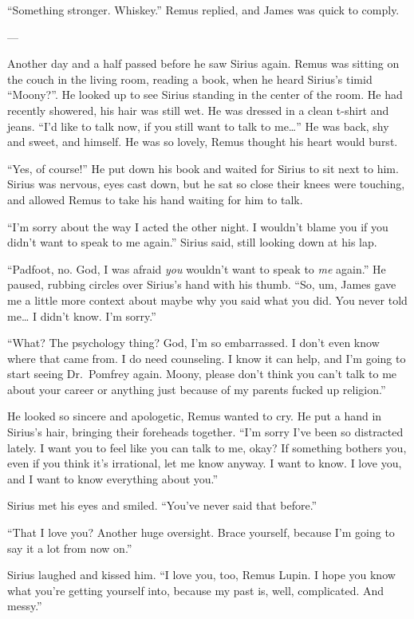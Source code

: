 \documentclass[12pt,twoside,openright]{memoir}
\begin{document}
``Something stronger. Whiskey.'' Remus replied, and James was quick to comply.

---

Another day and a half passed before he saw Sirius again. Remus was sitting on the couch in the living room, reading a book, when he heard Sirius's timid ``Moony?''. He looked up to see Sirius standing in the center of the room. He had recently showered, his hair was still wet. He was dressed in a clean t-shirt and jeans. ``I'd like to talk now, if you still want to talk to me…'' He was back, shy and sweet, and himself. He was so lovely, Remus thought his heart would burst.

``Yes, of course!'' He put down his book and waited for Sirius to sit next to him. Sirius was nervous, eyes cast down, but he sat so close their knees were touching, and allowed Remus to take his hand waiting for him to talk.

``I'm sorry about the way I acted the other night. I wouldn't blame you if you didn't want to speak to me again.'' Sirius said, still looking down at his lap.

``Padfoot, no. God, I was afraid \textit{you} wouldn't want to speak to \textit{me} again.'' He paused, rubbing circles over Sirius's hand with his thumb. ``So, um, James gave me a little more context about maybe why you said what you did. You never told me… I didn't know. I'm sorry.''

``What? The psychology thing? God, I'm so embarrassed. I don't even know where that came from. I do need counseling. I know it can help, and I'm going to start seeing Dr.\ Pomfrey again. Moony, please don't think you can't talk to me about your career or anything just because of my parents fucked up religion.'' 

He looked so sincere and apologetic, Remus wanted to cry. He put a hand in Sirius's hair, bringing their foreheads together. ``I'm sorry I've been so distracted lately. I want you to feel like you can talk to me, okay? If something bothers you, even if you think it's irrational, let me know anyway. I want to know. I love you, and I want to know everything about you.''

Sirius met his eyes and smiled. ``You've never said that before.''

``That I love you? Another huge oversight. Brace yourself, because I'm going to say it a lot from now on.'' 

Sirius laughed and kissed him. ``I love you, too, Remus Lupin. I hope you know what you're getting yourself into, because my past is, well, complicated. And messy.'' 
\end{document}
